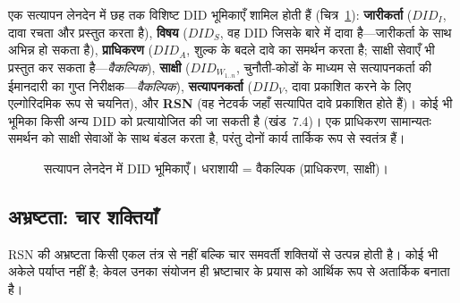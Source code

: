 \documentclass[11pt,a4paper,twocolumn]{article}
\begin{document}
एक सत्यापन लेनदेन में छह तक विशिष्ट DID भूमिकाएँ शामिल होती हैं (चित्र~\ref{fig:roles}): \textbf{जारीकर्ता} ($DID_I$, दावा रचता और प्रस्तुत करता है), \textbf{विषय} ($DID_S$, वह DID जिसके बारे में दावा है---जारीकर्ता के साथ अभिन्न हो सकता है), \textbf{प्राधिकरण} ($DID_A$, शुल्क के बदले दावे का समर्थन करता है; साक्षी सेवाएँ भी प्रस्तुत कर सकता है---\emph{वैकल्पिक}), \textbf{साक्षी} ($DID_{W_{1..n}}$, चुनौती-कोडों के माध्यम से सत्यापनकर्ता की ईमानदारी का गुप्त निरीक्षक---\emph{वैकल्पिक}), \textbf{सत्यापनकर्ता} ($DID_V$, दावा प्रकाशित करने के लिए एल्गोरिदमिक रूप से चयनित), और \textbf{RSN} (वह नेटवर्क जहाँ सत्यापित दावे प्रकाशित होते हैं)। कोई भी भूमिका किसी अन्य DID को प्रत्यायोजित की जा सकती है (खंड~7.4)। एक प्राधिकरण सामान्यतः समर्थन को साक्षी सेवाओं के साथ बंडल करता है, परंतु दोनों कार्य तार्किक रूप से स्वतंत्र हैं।

\begin{figure}[ht]
\centering
{}
\caption{सत्यापन लेनदेन में DID भूमिकाएँ। धराशायी = वैकल्पिक (प्राधिकरण, साक्षी)।}
\label{fig:roles}
\end{figure}

\subsection{अभ्रष्टता: चार शक्तियाँ}

RSN की अभ्रष्टता किसी एकल तंत्र से नहीं बल्कि चार समवर्ती शक्तियों से उत्पन्न होती है। कोई भी अकेले पर्याप्त नहीं है; केवल उनका संयोजन ही भ्रष्टाचार के प्रयास को आर्थिक रूप से अतार्किक बनाता है।
\end{document}
